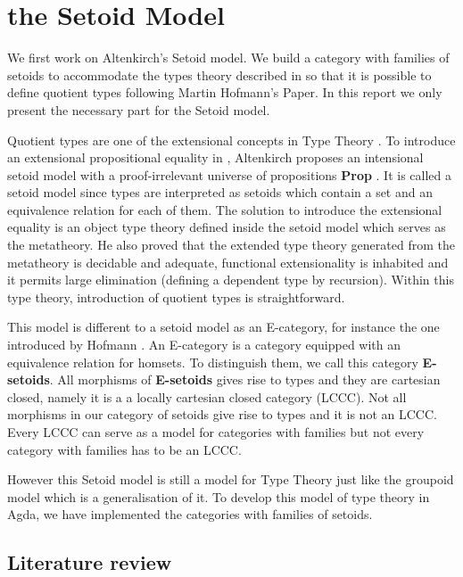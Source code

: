 \chapter{the Setoid Model}




We first work on Altenkirch's Setoid model. We build a category
with families of setoids to accommodate the types theory described in
\cite{alti:lics99}  so that it is possible to define quotient types
following Martin Hofmann's Paper\cite{hof:95:sm}.  In this report we
only present the
necessary part for the Setoid model.



Quotient types are one of the extensional concepts in Type Theory \cite{hof:phd}. To introduce an extensional propositional equality in \itt{}, 
Altenkirch \cite{alti:lics99} proposes an intensional setoid model with a proof-irrelevant universe of
propositions \textbf{Prop} . It is called a setoid model since types are interpreted as setoids which contain a set and an equivalence relation for each of them.
The solution to introduce the extensional equality is an object type theory defined inside the setoid model which serves as the metatheory. He also proved that the extended type theory generated from the metatheory is decidable and adequate, functional extensionality is
inhabited and it permits large elimination (defining a dependent type by recursion). Within this type theory,
introduction of quotient types is straightforward.

This model is different to a setoid model as an E-category, for instance
the one introduced by Hofmann \cite{hofmann1995interpretation} . An E-category is a category equipped with
an equivalence relation for homsets. To distinguish them, we call this
category \textbf{E-setoids}.  All morphisms of \textbf{E-setoids}
gives rise to types and they are cartesian closed, namely it is a a locally
cartesian closed category (LCCC). Not all morphisms in our category of setoids give
rise to types and it is not an LCCC. Every LCCC can serve as a model for categories with
families but not every category with families has to be an
LCCC. 

However this Setoid model is still a model for Type
Theory just like the groupoid model which is a generalisation of it.
To develop this model of type theory in Agda, we have implemented the categories with families of setoids.


\section{Literature review}




